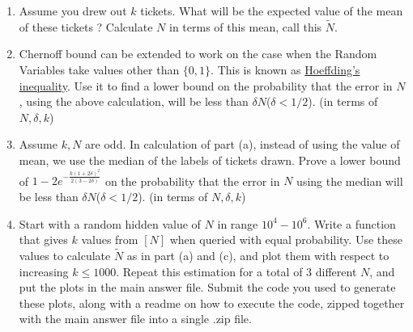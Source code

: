 \documentclass[10pt]{article}
\begin{document}
\begin{enumerate}
\begin{enumerate}
    \item Assume you drew out $k$ tickets. What will be the expected value of the mean of these tickets ? Calculate $N$ in terms of this mean, call this $\tilde{N}$.
    \item Chernoff bound can be extended to work on the case when the Random Variables take values other than $\{0,1\}$. This is known as \href{https://en.wikipedia.org/wiki/Hoeffding\%27s_inequality}{Hoeffding's inequality}. Use it to find a lower bound on the probability that the error in $N$, using the above calculation, will be less than $\delta N$($\delta<1/2$). (in terms of $N,\delta,k$)
    \item Assume $k,N$ are odd. In calculation of part (a), instead of using the value of mean, we use the median of the labels of tickets drawn. Prove a lower bound of $1-2e^{-\frac{k(1+2\delta)^2}{2(3-2\delta)}}$ on the probability that the error in $N$ using the median will be less than $\delta N$($\delta<1/2$). (in terms of $N,\delta,k$)
    \item Start with a random hidden value of $N$ in range $10^4-10^6$. Write a function that gives $k$ values from $[N]$ when queried with equal probability. Use these values to calculate $\tilde{N}$ as in part (a) and (c), and plot them with respect to increasing $k\leq 1000$. Repeat this estimation for a total of 3 different $N$, and put the plots in the main answer file. Submit the code you used to generate these plots, along with a readme on how to execute the code, zipped together with the main answer file into a single .zip file.
\end{enumerate}



\end{enumerate}
\end{document}
